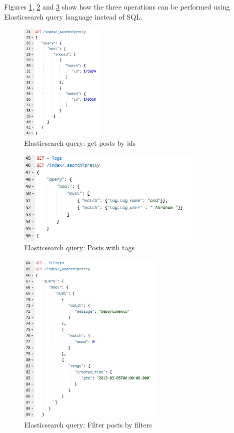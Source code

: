Figures \ref{fig:es-query-es-get-posts-by-ids}, \ref{fig:es-query-es-get-tags} and \ref{fig:es-get-filters} show how the three operations can be performed using Elasticsearch query language instead of SQL. 

\begin{figure}[ht!]
	\centering
	\includegraphics[width=40mm]{Imagens/es-get-posts-by-ids.png}
	\caption{Elasticsearch query: get posts by ids\label{fig:es-query-es-get-posts-by-ids}}
\end{figure}

\begin{figure}[ht!]
	\centering
	\includegraphics[width=90mm]{Imagens/es-get-tags.png}
	\caption{Elasticsearch query: Posts with tags \label{fig:es-query-es-get-tags}}
\end{figure}


\begin{figure}[ht!]
	\centering
	\includegraphics[width=70mm]{Imagens/es-get-filters.png}
	\caption{Elasticsearch query: Filter posts by filters \label{fig:es-get-filters}}
\end{figure}

